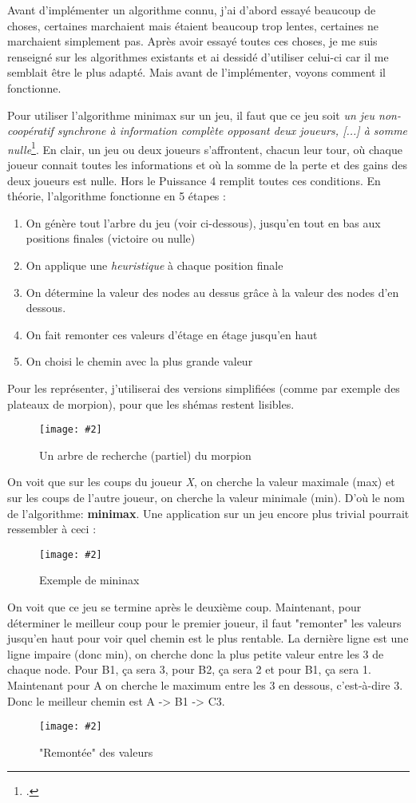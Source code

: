 \documentclass[a4paper]{article}
\newcommand{\img}[3][]{
    \begin{figure}[H]
        \centering
        \texttt{[image: \#2]}
        \caption{#1}    
    \end{figure}
}
\begin{document}
    Avant d'implémenter un algorithme connu, j'ai d'abord essayé beaucoup de choses, certaines marchaient mais étaient beaucoup trop lentes, certaines ne marchaient simplement pas. Après avoir essayé toutes ces choses, je me suis renseigné sur les algorithmes existants et ai dessidé d'utiliser celui-ci car il me semblait être le plus adapté. Mais avant de l'implémenter, voyons comment il fonctionne.
    
    Pour utiliser l'algorithme minimax sur un jeu, il faut que ce jeu soit \textit{un jeu non-coopératif synchrone à information complète opposant deux joueurs, [...] à somme nulle}\footcite{wiki_minimax_neuman}. En clair, un jeu ou deux joueurs s'affrontent, chacun leur tour, où chaque joueur connait toutes les informations et où la somme de la perte et des gains des deux joueurs est nulle. Hors le Puissance 4 remplit toutes ces conditions. En théorie, l'algorithme fonctionne en 5 étapes : 
    \begin{enumerate}
        \item On génère tout l'arbre du jeu (voir ci-dessous), jusqu'en tout en bas aux positions finales (victoire ou nulle)
        \item On applique une \textit{heuristique} à chaque position finale
        \item On détermine la valeur des nodes au dessus grâce à la valeur des nodes d'en dessous.
        \item On fait remonter ces valeurs d'étage en étage jusqu'en haut
        \item On choisi le chemin avec la plus grande valeur
    \end{enumerate}
    Pour les représenter, j'utiliserai des versions simplifiées (comme par exemple des plateaux de morpion), pour que les shémas restent lisibles.

    \img[Un arbre de recherche (partiel) du morpion]{Images/MinimaxShema.png}{0.8}
    
    On voit que sur les coups du joueur \textit{X}, on cherche la valeur maximale (max) et sur les coups de l'autre joueur, on cherche la valeur minimale (min). D'où le nom de l'algorithme: \textbf{minimax}. Une application sur un jeu encore plus trivial pourrait ressembler à ceci :
    \img[Exemple de mininax]{Images/MinimaxShema2.png}{0.75}
    On voit que ce jeu se termine après le deuxième coup. Maintenant, pour déterminer le meilleur coup pour le premier joueur, il faut "remonter" les valeurs jusqu'en haut pour voir quel chemin est le plus rentable. La dernière ligne est une ligne impaire (donc min), on cherche donc la plus petite valeur entre les 3 de chaque node. Pour B1, ça sera 3, pour B2, ça sera 2 et pour B1, ça sera 1. Maintenant pour A on cherche le maximum entre les 3 en dessous, c'est-à-dire 3. Donc le meilleur chemin est A -> B1 -> C3.
    \img["Remontée" des valeurs]{Images/MinimaxShema3.png}{0.6}
\end{document}
